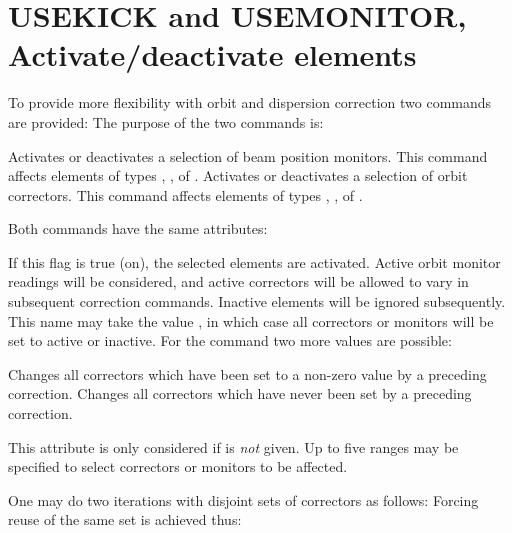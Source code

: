 \section{USEKICK and USEMONITOR, Activate/deactivate elements}
\label{S-USECOM}
To provide more flexibility with orbit and dispersion correction two
commands are provided:
The purpose of the two commands is:
\begin{mylist}
Activates or deactivates a selection of beam position monitors.
This command affects elements of types , ,
of .
Activates or deactivates a selection of orbit correctors.
This command affects elements of types , ,
of .
\end{mylist}
Both commands have the same attributes:
\begin{mylist}
If this flag is true (on), the selected elements are activated.
Active orbit monitor readings will be considered,
and active correctors will be allowed to vary in subsequent correction
commands.
Inactive elements will be ignored subsequently.
This name may take the value , in which case all correctors
or monitors will be set to active or inactive.
For the  command two more values are possible:
\begin{mylist}
Changes all correctors which have been set to a non-zero value
by a preceding correction.
Changes all correctors which have never been set by a preceding
correction.
\end{mylist}
This attribute is only considered if  is {\em not} given.
Up to five ranges may be specified to select correctors or monitors to
be affected.
\end{mylist}
One may do two iterations with disjoint sets of correctors as follows:
Forcing reuse of the same set is achieved thus:


